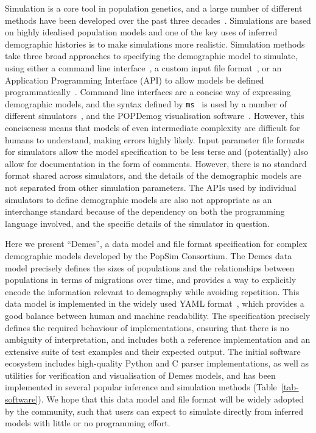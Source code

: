 \documentclass[11pt]{article}
\newcommand{\ms}[0]{\texttt{ms}}
\begin{document}
Simulation is a core tool in population genetics, and a
large number of different methods have been developed
over the past three decades~\citep{carvajal2008simulation,liu2008survey,
arenas2012simulation,yuan2012overview,hoban2012computer}.
Simulations are based on highly idealised population models
and one of the key uses of inferred demographic histories
is to make simulations more realistic.
Simulation methods take three broad approaches to specifying
the demographic model to simulate,
using either a command line
interface~\citep[e.g.][]{hudson2002generating,kern2016discoal},
a custom input file
format~\citep[e.g.][]{guillaume2006nemo,excoffier2011fastsimcoal,shlyakhter2014cosi2},
or an Application Programming Interface (API) to allow
models be defined programmatically~\citep[e.g.][]{
thornton2014cpp,thornton2019-nu,baumdicker2021-iu,kelleher2016efficient,becheler2019quetzal,haller2019slim}.
Command line interfaces are a concise way of expressing
demographic models, and the syntax defined by \ms~\citep{hudson2002generating}
is used by a number of different
simulators~\citep[e.g.][]{ewing2010msms,chen2009fast,staab2015scrm},
and the POPDemog visualisation software~\citep{zhou2018popdemog}.
However, this conciseness means that models of even intermediate complexity
are difficult for humans to understand, making errors highly likely.
Input parameter file formats for simulators allow the model specification
to be less terse and (potentially) also allow for documentation in the
form of comments. However, there is no standard format shared across
simulators, and the details of the demographic models are not separated
from other simulation parameters. The APIs used by individual simulators
to define demographic models are also not appropriate as an interchange
standard because of the dependency on both the programming language involved,
and the specific details of the simulator in question.

Here we present ``Demes'', a data model and file format specification for
complex demographic models developed by the PopSim Consortium. The Demes data
model precisely defines the sizes of populations and the relationships
between populations in terms of migrations over time,
and provides a way to explicitly encode the
information relevant to demography while avoiding repetition. This data model
is implemented in the widely used YAML format~\citep{ben2009yaml}, which
provides a good balance between human and machine readability. The
specification precisely defines the required behaviour of implementations,
ensuring that there is no ambiguity of interpretation, and includes both a
reference implementation and an extensive suite of test examples and their
expected output. The initial software ecosystem includes high-quality Python
and C parser implementations, as well as utilities for verification and
visualisation of Demes models, and has been implemented in several popular
inference and simulation methods (Table~\ref{tab-software}).  We hope that this
data model and file format will be widely adopted by the community, such that
users can expect to simulate directly from inferred models with little or no
programming effort.
\end{document}
